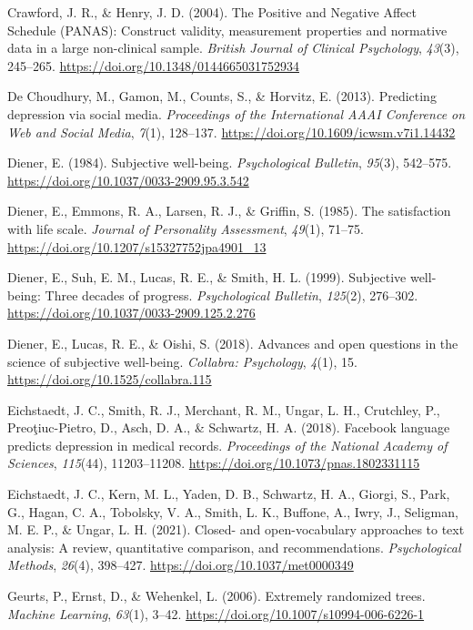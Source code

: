 \documentclass[11pt,letterpaper]{article}
\newcommand{\APAref}{\par\noindent\hangindent=0.5in\hangafter=1\relax}
\begin{document}
\APAref Crawford, J. R., \& Henry, J. D. (2004). The Positive and Negative Affect Schedule (PANAS): Construct validity, measurement properties and normative data in a large non-clinical sample. \emph{British Journal of Clinical Psychology}, \emph{43}(3), 245--265. \url{https://doi.org/10.1348/0144665031752934}

\APAref De Choudhury, M., Gamon, M., Counts, S., \& Horvitz, E. (2013). Predicting depression via social media. \emph{Proceedings of the International AAAI Conference on Web and Social Media}, \emph{7}(1), 128--137. \url{https://doi.org/10.1609/icwsm.v7i1.14432}

\APAref Diener, E. (1984). Subjective well-being. \emph{Psychological Bulletin}, \emph{95}(3), 542--575. \url{https://doi.org/10.1037/0033-2909.95.3.542}

\APAref Diener, E., Emmons, R. A., Larsen, R. J., \& Griffin, S. (1985). The satisfaction with life scale. \emph{Journal of Personality Assessment}, \emph{49}(1), 71--75. \url{https://doi.org/10.1207/s15327752jpa4901_13}

\APAref Diener, E., Suh, E. M., Lucas, R. E., \& Smith, H. L. (1999). Subjective well-being: Three decades of progress. \emph{Psychological Bulletin}, \emph{125}(2), 276--302. \url{https://doi.org/10.1037/0033-2909.125.2.276}

\APAref Diener, E., Lucas, R. E., \& Oishi, S. (2018). Advances and open questions in the science of subjective well-being. \emph{Collabra: Psychology}, \emph{4}(1), 15. \url{https://doi.org/10.1525/collabra.115}

\APAref Eichstaedt, J. C., Smith, R. J., Merchant, R. M., Ungar, L. H., Crutchley, P., Preoţiuc-Pietro, D., Asch, D. A., \& Schwartz, H. A. (2018). Facebook language predicts depression in medical records. \emph{Proceedings of the National Academy of Sciences}, \emph{115}(44), 11203--11208. \url{https://doi.org/10.1073/pnas.1802331115}

\APAref Eichstaedt, J. C., Kern, M. L., Yaden, D. B., Schwartz, H. A., Giorgi, S., Park, G., Hagan, C. A., Tobolsky, V. A., Smith, L. K., Buffone, A., Iwry, J., Seligman, M. E. P., \& Ungar, L. H. (2021). Closed- and open-vocabulary approaches to text analysis: A review, quantitative comparison, and recommendations. \emph{Psychological Methods}, \emph{26}(4), 398--427. \url{https://doi.org/10.1037/met0000349}

\APAref Geurts, P., Ernst, D., \& Wehenkel, L. (2006). Extremely randomized trees. \emph{Machine Learning}, \emph{63}(1), 3--42. \url{https://doi.org/10.1007/s10994-006-6226-1}
\end{document}
